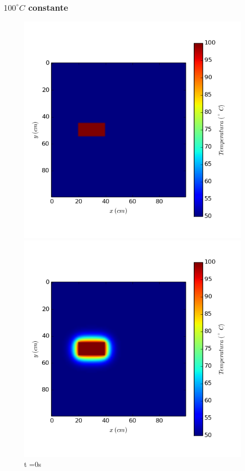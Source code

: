 \documentclass{article}
\begin{document}
\subsubsection{$100^\circ C$ constante}
\begin{figure}[H]
  \includegraphics[width=\linewidth]{fijasCte0.png}
  \caption{t =0s}\label{fig:awesome_image1}
\endminipage\hfill
{}
  \includegraphics[width=\linewidth]{fijasCte100.png}

\end{figure}
\end{document}
